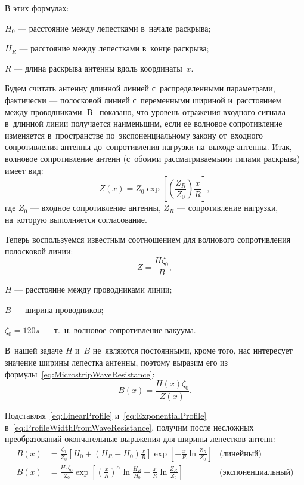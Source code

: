 \noindent
В этих формулах:
\begin{where}
\item $H_0$ --- расстояние между лепестками в~начале раскрыва;
\item $H_R$ --- расстояние между лепестками в~конце раскрыва;
\item $R$ --- длина раскрыва антенны вдоль координаты~$x$.
\end{where}

\noindent
Будем считать антенну длинной линией с~распределенными параметрами, фактически
--- полосковой линией с~переменными шириной и~расстоянием между проводниками.
В~\cite{bib:Aizenberg1985} показано, что уровень отражения входного сигнала
в~длинной линии получается наименьшим, если ее волновое сопротивление изменяется
в~пространстве по~экспоненциальному закону от~входного сопротивления антенны
до~сопротивления нагрузки на~выходе антенны. Итак, волновое сопротивление антенн
(с~обоими рассматриваемыми типами раскрыва) имеет вид:
\begin{equation}
    \label{eq:HornWaveResistance}
    Z(x) = Z_0 \exp
    \left[
        \left(\frac{Z_R}{Z_0}\right)
        \frac{x}{R}
    \right],
\end{equation}
где $Z_0$ --- входное сопротивление антенны, $Z_R$ --- сопротивление нагрузки,
на~которую выполняется согласование.

Теперь воспользуемся известным соотношением для волнового сопротивления
полосковой линии:
\begin{equation}
    \label{eq:MicrostripWaveResistance}
    Z = \frac{H\zeta_0}{B},
\end{equation}
%
\begin{where}
\item $H$ --- расстояние между проводниками линии;
\item $B$ --- ширина проводников;
\item $\zeta_0=120\pi$ --- т.~н. волновое сопротивление вакуума.
\end{where}

\noindent
В~нашей задаче $H$ и~$B$ не~являются постоянными, кроме того, нас интересует
значение ширины лепестка антенны, поэтому выразим его из
формулы~\eqref{eq:MicrostripWaveResistance}:
\begin{equation}
    \label{eq:ProfileWidthFromWaveResistance}
    B(x) = \frac{H(x)\zeta_0}{Z(x)}.
\end{equation}

Подставляя~\eqref{eq:LinearProfile} и~\eqref{eq:ExponentialProfile}
в~\eqref{eq:ProfileWidthFromWaveResistance}, получим после несложных
преобразований окончательные выражения для ширины лепестков антенн:
\begin{align}
    \label{eq:LinearProfileWidth}
    B(x) &= \frac{\zeta_0}{Z_0}
    \left[ H_0 + (H_R-H_0)\frac{x}{R} \right]
    \exp\left[
        -\frac{x}{R}\ln\frac{Z_R}{Z_0}
    \right] & \text{(линейный)} \\
    \label{eq:ExponentialProfileWidth}
    B(x) &= \frac{H_0\zeta_0}{Z_0}
    \exp\left[
        \left(\frac{x}{R}\right)^\alpha \ln\frac{H_R}{H_0} -
        \frac{x}{R} \ln\frac{Z_R}{Z_0}
    \right] & \text{(экспоненциальный)}
\end{align}


